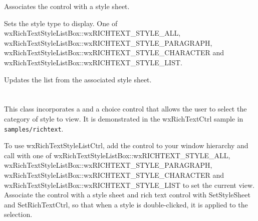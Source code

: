 
Associates the control with a style sheet.

\label{wxrichtextstylelistboxsetstyletype}


Sets the style type to display. One of wxRichTextStyleListBox::wxRICHTEXT\_STYLE\_ALL, wxRichTextStyleListBox::wxRICHTEXT\_STYLE\_PARAGRAPH,
wxRichTextStyleListBox::wxRICHTEXT\_STYLE\_CHARACTER and wxRichTextStyleListBox::wxRICHTEXT\_STYLE\_LIST.

\label{wxrichtextstylelistboxupdatestyles}


Updates the list from the associated style sheet.


\section{}\label{wxrichtextstylelistctrl}

This class incorporates a  and
a choice control that allows the user to select the category of style to view.
It is demonstrated in the wxRichTextCtrl sample in {\tt samples/richtext}.

To use wxRichTextStyleListCtrl, add the control to your window hierarchy and
call  with
one of wxRichTextStyleListBox::wxRICHTEXT\_STYLE\_ALL, wxRichTextStyleListBox::wxRICHTEXT\_STYLE\_PARAGRAPH,
wxRichTextStyleListBox::wxRICHTEXT\_STYLE\_CHARACTER and wxRichTextStyleListBox::wxRICHTEXT\_STYLE\_LIST to set the current view.
Associate the control with a style sheet and rich text control with SetStyleSheet and SetRichTextCtrl,
so that when a style is double-clicked, it is applied to the selection.


\twocolwidtha{5cm}
\begin{twocollist}\itemsep=0pt
\end{twocollist}


